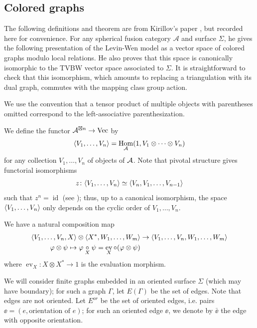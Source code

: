 \documentclass{amsart}
\DeclareMathOperator{\id}{id}
\DeclareMathOperator{\Vect}{Vec}
\DeclareMathOperator{\Hom}{Hom}
\DeclareMathOperator{\ev}{ev}
\newcommand{\one}{1}
\newcommand{\Ga}{\Gamma}
\newcommand{\ph}{\varphi}
\newcommand{\Si}{\Sigma}
\begin{document}
\subsection{Colored graphs}\label{s:colored}

The following definitions and theorem are from Kirillov's paper
 \cite{kirillovStringNets}, but recorded here for convenience.  
For any spherical fusion category $\mathcal A$ and surface $\Si$, he gives the following presentation of the Levin-Wen model
as a vector space of colored graphs modulo
local relations.  He also proves that this space 
is canonically isomorphic to the TVBW vector space associated to $\Si$.  It is
straightforward to check that this isomorphism, which amounts to replacing a 
triangulation with its dual graph,  commutes with the mapping class group action.

We use the convention that a tensor product of multiple objects with parentheses
omitted correspond to the left-associative parenthesization.

We define the functor $\A^{\boxtimes n}\to \Vect$ by
\begin{equation}\label{e:vev}
\<V_1,\dots,V_n\>=\Hom_\A(\one,
V_1\otimes\dots\otimes V_n)
\end{equation}
for any collection $V_1,\dots, V_n$ of objects of $\mathcal{A}$. Note that pivotal
structure gives functorial isomorphisms
\begin{equation}\label{e:cyclic}
z\colon\langle V_1,\dots,V_n\rangle\simeq \langle V_n, V_1,\dots,V_{n-1}\rangle
\end{equation}
such that $z^n=\id$ (see \cite[Section 5.3]{BK}); thus, up to a canonical
isomorphism, the space $\langle V_1,\dots,V_n\rangle$ only depends on the cyclic order
of $V_1,\dots, V_n$.

We have a natural composition map 
\begin{equation}\label{e:composition}
\begin{aligned}
 \<V_1,\dots,V_n, X\> \otimes \<X^*, W_1,\dots,
W_m\>&\to\<V_1,\dots,V_n, W_1,\dots, W_m\> \\
\ph\otimes\psi\mapsto \ph\cc{X}\psi= \ev_X \circ (\ph\otimes\psi)
\end{aligned}
\end{equation}
where $\ev_X \colon X \otimes  X^* \to \one$ is the evaluation morphism.

We will consider finite  graphs embedded in an oriented surface $\Si$
(which may have boundary); for such a
graph $\Ga$, let $E(\Ga)$ be the set of edges. Note that edges are not
oriented. Let $E^{or}$ be the set of oriented edges, i.e. pairs $\ee=(e,
\text{orientation of } e)$; for such an oriented edge $\ee$, we denote by
$\bar{\ee}$ the edge with opposite orientation.
\end{document}
